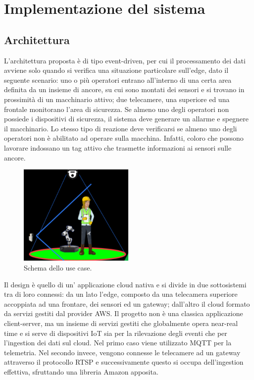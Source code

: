 \chapter{Implementazione del sistema}

\section{Architettura}
L’architettura proposta è di tipo event-driven, per cui il processamento dei dati avviene solo quando si verifica una situazione particolare sull’edge, dato il seguente scenario: uno o più operatori entrano all’interno di una certa area definita da un insieme di ancore, su cui sono montati dei sensori e si trovano in prossimità di un macchinario attivo; due telecamere, una superiore ed una frontale monitorano l’area di sicurezza. Se almeno uno degli operatori non possiede i dispositivi di sicurezza, il sistema deve generare un allarme e spegnere il macchinario. Lo stesso tipo di reazione deve verificarsi se almeno uno degli operatori non è abilitato ad operare sulla macchina. Infatti, coloro che possono lavorare indossano un tag attivo che trasmette informazioni ai sensori sulle ancore.

\begin{figure}[htbp]
    \centering
    \includegraphics[width=0.5\textwidth]{figures/use-case.png}
    \caption{Schema dello use case.} 
    \label{use-case}
\end{figure}


 Il design è quello di un’ applicazione cloud nativa e si divide in due sottosistemi tra di loro connessi: da un lato l'edge, composto da una telecamera superiore accoppiata ad una frontare, dei sensori ed un gateway; dall'altro il cloud formato da servizi gestiti dal provider AWS. Il progetto non è una classica applicazione client-server, ma un insieme di servizi gestiti che globalmente opera near-real time e si serve di dispositivi IoT sia per la rilevazione degli eventi che per l’ingestion dei dati sul cloud. Nel primo caso viene utilizzato MQTT per la telemetria. Nel secondo invece, vengono connesse le telecamere ad un gateway attraverso il protocollo RTSP e successivamente questo si occupa dell'ingestion effettiva, sfruttando una libreria Amazon apposita. 

